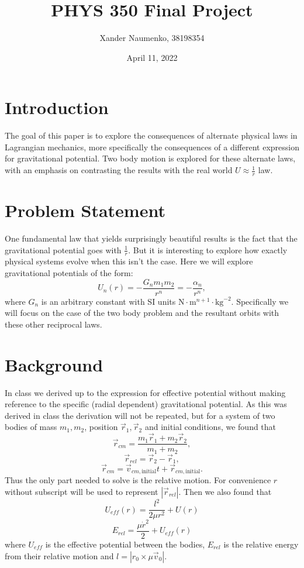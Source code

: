 \documentclass[letterpaper, reqno,11pt]{article}
\begin{document}
\title{PHYS 350 Final Project}
\date{April 11, 2022}
\author{Xander Naumenko, 38198354}
\maketitle

\tableofcontents

\section{Introduction}
 
The goal of this paper is to explore the consequences of alternate physical laws in Lagrangian mechanics, more specifically the consequences of a different expression for gravitational potential. Two body motion is explored for these alternate laws, with an emphasis on contrasting the results with the real world $U\approx\frac{1}{r}$ law. 

\section{Problem Statement}

One fundamental law that yields surprisingly beautiful results is the fact that the gravitational potential goes with $\frac{1}{r}$. But it is interesting to explore how exactly physical systems evolve when this isn't the case. Here we will explore gravitational potentials of the form: 
\[
U_n(r)=-\frac{G_nm_1m_2}{r^{n}}=-\frac{\alpha_n}{r^{n}}
,\]
where $G_n$ is an arbitrary constant with SI units $\text{N}\cdot \text{m}^{n+1}\cdot \text{kg}^{-2}$. Specifically we will focus on the case of the two body problem and the resultant orbits with these other reciprocal laws. 

\section{Background}

In class we derived up to the expression for effective potential without making reference to the specific (radial dependent) gravitational potential. As this was derived in class the derivation will not be repeated, but for a system of two bodies of mass $ m_1, m_2$, position $\vec r_1, \vec r_2$ and initial conditions, we found that 
\[
\vec r_{cm}=\frac{m_1\vec r_1+m_2\vec r_2}{m_1+m_2}
,\]
\[
\vec r_{rel}=\vec r_2-\vec r_1
,\]
\[
\vec r_{cm}=\vec v_{cm, \text{initial}}t+\vec r_{cm, \text{initial}}
.\]
Thus the only part needed to solve is the relative motion. For convenience $r$ without subscript will be used to represent $|\vec r_{rel}|$. Then we also found that 
 \[
U_{eff}(r)=\frac{l^2}{2\mu r^2}+U(r)
\]
\[
E_{rel}=\frac{\mu\dot r^2}{2}+U_{eff}(r)
\]
where $U_{eff}$ is the effective potential between the bodies, $E_{rel}$ is the relative energy from their relative motion and $l=\left| r_0\times \mu\vec v_0 \right| $. 
\end{document}
